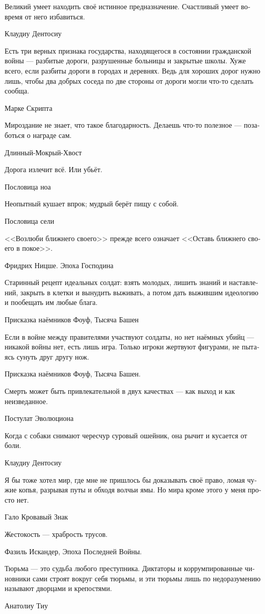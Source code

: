\documentclass[a4paper,12pt,fleqn]{book}\usepackage{polyglossia}\setdefaultlanguage[babelshorthands=true]{russian}\setotherlanguage{english}\defaultfontfeatures{Ligatures=TeX,Mapping=tex-text}\usepackage{xcolor}\newcommand{\ml}[3]{#2}
\begin{document}
{\epigraph
{Великий умеет находить своё истинное предназначение.
Счастливый умеет вовремя от него избавиться.}
{Клаудиу Дентосиу}

\epigraph
{Есть три верных признака государства, находящегося в состоянии гражданской войны --- разбитые дороги, разрушенные больницы и закрытые школы.
Хуже всего, если разбиты дороги в городах и деревнях.
Ведь для хороших дорог нужно лишь, чтобы два добрых соседа по две стороны от дороги могли что-то сделать сообща.}
{Марке Скрипта}

\epigraph
{Мироздание не знает, что такое благодарность.
Делаешь что-то полезное --- позаботься о награде сам.}
{Длинный-Мокрый-Хвост}

\epigraph{
\ml{$0$}
{Дорога излечит всё.}
{The road heal you.}
\ml{$0$}
{Или убьёт.}
{Or kill you.}
}{Пословица ноа}

\epigraph
{Неопытный кушает впрок;
мудрый берёт пищу с собой.}
{Пословица сели}

\epigraph
{<<Возлюби ближнего своего>> прежде всего означает <<Оставь ближнего своего в покое>>.}
{Фридрих Ницше.
Эпоха Господина}

\epigraph
{Старинный рецепт идеальных солдат: взять молодых, лишить знаний и наставлений, закрыть в клетки и вынудить выживать, а потом дать выжившим идеологию и пообещать им любые блага.}
{Присказка наёмников Фоуф, Тысяча Башен}

\epigraph
{Если в войне между правителями участвуют солдаты, но нет наёмных убийц --- никакой войны нет, есть лишь игра.
Только игроки жертвуют фигурами, не пытаясь сунуть друг другу нож.}
{Присказка наёмников Фоуф, Тысяча Башен.}

\epigraph
{Смерть может быть привлекательной в двух качествах --- как выход и как неизведанное.}
{Постулат Эволюциона}

\epigraph
{Когда с собаки снимают чересчур суровый ошейник, она рычит и кусается от боли.}
{Клаудиу Дентосиу}

\epigraph
{Я бы тоже хотел мир, где мне не пришлось бы доказывать своё право, ломая чужие копья, разрывая путы и обходя волчьи ямы.
Но мира кроме этого у меня просто нет.}
{Гало Кровавый Знак}

\epigraph
{Жестокость --- храбрость трусов.}
{Фазиль Искандер, Эпоха Последней Войны.}

\epigraph
{Тюрьма --- это судьба любого преступника.
Диктаторы и коррумпированные чиновники сами строят вокруг себя тюрьмы, и эти тюрьмы лишь по недоразумению называют дворцами и крепостями.}
{Анатолиу Тиу}

}
\end{document}

